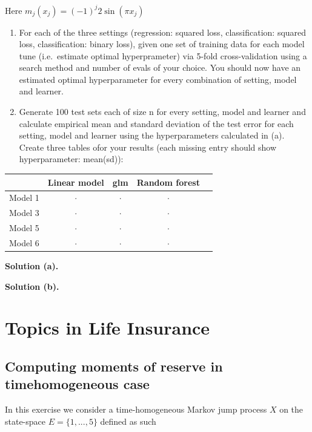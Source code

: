 \documentclass[a4paper,12pt,openany]{book}
\providecommand{\tightlist}{%
 \setlength{\itemsep}{0pt}\setlength{\parskip}{0pt}}
\begin{document}
Here \(m_j(x_j)=(-1)^j2\sin(\pi x_j)\)

\begin{enumerate}
\def\labelenumi{\alph{enumi}.}
\tightlist
\item
  For each of the three settings (regression: squared loss, classification: squared loss, classification: binary loss), given one set of training data for each model tune (i.e.~estimate optimal hyperprameter) via 5-fold cross-validation using a search method and number of evals of your choice. You should now have an estimated optimal hyperparameter for every combination of setting, model and learner.
\item
  Generate 100 test sets each of size n for every setting, model and learner and calculate empirical mean and standard deviation of the test error for each setting, model and learner using the hyperparameters calculated in (a). Create three tables ofor your results (each missing entry should show hyperparameter: mean(sd)):
\end{enumerate}

\begin{longtable}[]{@{}lcccc@{}}
\toprule()
& Linear model & glm & Random forest & \\
\midrule()
\endhead
Model 1 & \(\cdot\) & \(\cdot\) & \(\cdot\) & \\
Model 3 & \(\cdot\) & \(\cdot\) & \(\cdot\) & \\
Model 5 & \(\cdot\) & \(\cdot\) & \(\cdot\) & \\
Model 6 & \(\cdot\) & \(\cdot\) & \(\cdot\) & \\
\bottomrule()
\end{longtable}

\textbf{Solution (a).}

\textbf{Solution (b).}

\hypertarget{topics-in-life-insurance}{%
\chapter{Topics in Life Insurance}\label{topics-in-life-insurance}}

\hypertarget{computing-moments-of-reserve-in-timehomogeneous-case}{%
\section{Computing moments of reserve in timehomogeneous case}\label{computing-moments-of-reserve-in-timehomogeneous-case}}

In this exercise we consider a time-homogeneous Markov jump process \(X\) on the state-space \(E=\{1,...,5\}\) defined as such
\end{document}
